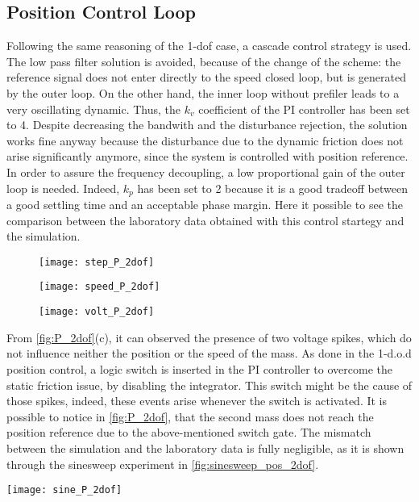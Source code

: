 \newpage
\subsection{Position Control Loop}

Following the same reasoning of the 1-dof case, a cascade control strategy is used. The low pass filter solution is avoided, because of the change of the scheme: the reference signal does not enter directly to the speed closed loop, but is generated by the outer loop. On the other hand, the inner loop without prefiler leads to a very oscillating dynamic. Thus, the $k_v$ coefficient of the PI controller has been set to 4. Despite decreasing the bandwith and the disturbance rejection, the solution works fine anyway because the disturbance due to the dynamic friction does not arise significantly anymore, since the system is controlled with position reference.
In order to assure the frequency decoupling, a low proportional gain of the outer loop is needed. Indeed, $k_p$ has been set to 2 because it is a good tradeoff between a good settling time and an acceptable phase margin.
\newline
Here it possible to see the comparison between the laboratory data obtained with this control startegy and the simulation.
\begin{figure*}[h]
	\centering
	\begin{subfigure}{0.48\columnwidth}
		\texttt{[image: step\_P\_2dof]}
	\end{subfigure}
	\begin{subfigure}{0.45\columnwidth}
		\texttt{[image: speed\_P\_2dof]}
	\end{subfigure}
	\begin{subfigure}{0.45\columnwidth}
		\texttt{[image: volt\_P\_2dof]}
	\end{subfigure}
	\caption{Position control loop with $k_{p} =2$ with a position step of $\frac{\pi}{4}$}
	\label{fig:P_2dof}
\end{figure*}

From \cref{fig:P_2dof}(c), it can observed the presence of two voltage spikes, which do not influence neither the position or the speed of the mass. As done in the 1-d.o.d position control, a logic switch is inserted in the PI controller to overcome the static friction issue, by disabling the integrator. This switch might be the cause of those spikes, indeed, these events arise whenever the switch is activated. 
It is possible to notice in \cref{fig:P_2dof}, that the second mass does not reach the position reference due to the above-mentioned switch gate.
The mismatch between the simulation and the laboratory data is fully negligible, as it is shown through the sinesweep experiment in \cref{fig:sinesweep_pos_2dof}.
\begin{figure*}[h]
	\centering
	\texttt{[image: sine\_P\_2dof]}
	\caption{Sineweep experiment from 0.1 Hz to 1 Hz in 100s}
	\label{fig:sinesweep_pos_2dof}
\end{figure*}